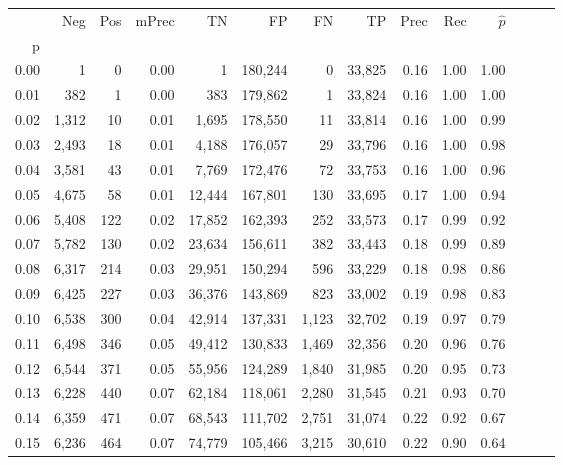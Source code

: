\begin{tabular}{rrrrrrrrrrrrrr}
\toprule
{} &    Neg &  Pos & mPrec &       TN &       FP &      FN &      TP &  Prec &   Rec & $\hat{p}$ \\
p    &        &      &       &          &          &         &         &       &       &           \\
\midrule
0.00 &      1 &    0 &  0.00 &        1 &  180,244 &       0 &  33,825 &  0.16 &  1.00 &      1.00 \\
0.01 &    382 &    1 &  0.00 &      383 &  179,862 &       1 &  33,824 &  0.16 &  1.00 &      1.00 \\
0.02 &  1,312 &   10 &  0.01 &    1,695 &  178,550 &      11 &  33,814 &  0.16 &  1.00 &      0.99 \\
0.03 &  2,493 &   18 &  0.01 &    4,188 &  176,057 &      29 &  33,796 &  0.16 &  1.00 &      0.98 \\
0.04 &  3,581 &   43 &  0.01 &    7,769 &  172,476 &      72 &  33,753 &  0.16 &  1.00 &      0.96 \\
0.05 &  4,675 &   58 &  0.01 &   12,444 &  167,801 &     130 &  33,695 &  0.17 &  1.00 &      0.94 \\
0.06 &  5,408 &  122 &  0.02 &   17,852 &  162,393 &     252 &  33,573 &  0.17 &  0.99 &      0.92 \\
0.07 &  5,782 &  130 &  0.02 &   23,634 &  156,611 &     382 &  33,443 &  0.18 &  0.99 &      0.89 \\
0.08 &  6,317 &  214 &  0.03 &   29,951 &  150,294 &     596 &  33,229 &  0.18 &  0.98 &      0.86 \\
0.09 &  6,425 &  227 &  0.03 &   36,376 &  143,869 &     823 &  33,002 &  0.19 &  0.98 &      0.83 \\
0.10 &  6,538 &  300 &  0.04 &   42,914 &  137,331 &   1,123 &  32,702 &  0.19 &  0.97 &      0.79 \\
0.11 &  6,498 &  346 &  0.05 &   49,412 &  130,833 &   1,469 &  32,356 &  0.20 &  0.96 &      0.76 \\
0.12 &  6,544 &  371 &  0.05 &   55,956 &  124,289 &   1,840 &  31,985 &  0.20 &  0.95 &      0.73 \\
0.13 &  6,228 &  440 &  0.07 &   62,184 &  118,061 &   2,280 &  31,545 &  0.21 &  0.93 &      0.70 \\
0.14 &  6,359 &  471 &  0.07 &   68,543 &  111,702 &   2,751 &  31,074 &  0.22 &  0.92 &      0.67 \\
0.15 &  6,236 &  464 &  0.07 &   74,779 &  105,466 &   3,215 &  30,610 &  0.22 &  0.90 &      0.64 \\

\end{tabular}
